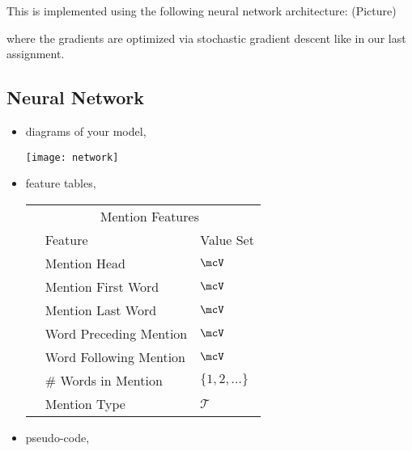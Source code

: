\documentclass[11pt]{article}
\begin{document}
This is implemented using the following neural network architecture:
(Picture)

where the gradients are optimized via stochastic gradient descent like in our last assignment. 

\subsection{Neural Network}

\begin{itemize}
\item diagrams of your model,

  \begin{center}
    \texttt{[image: network]}
  \end{center}
\item feature tables,

  \begin{center}
    \begin{tabular}{@{}lll@{}}
      \toprule
      &\multicolumn{2}{c}{Mention Features  } \\
      & Feature & Value Set\\
      \midrule
      & Mention Head & $\mcV$ \\
      & Mention First Word & $\mcV$ \\
      & Mention Last Word & $\mcV$ \\
      & Word Preceding Mention & $\mcV$ \\
      & Word Following Mention & $\mcV$\\
      & \# Words in Mention & $\{1, 2, \ldots \}$ \\
      & Mention Type & $\mathcal{T}$ \\
      \bottomrule
    \end{tabular}
  \end{center}

\item pseudo-code,

  \begin{algorithmic}[1]
    \EndFor{}
    \EndFor{}
    \EndFor{}
    \EndFor{}
    \EndProcedure{}
  \end{algorithmic}

\end{itemize}
\end{document}
